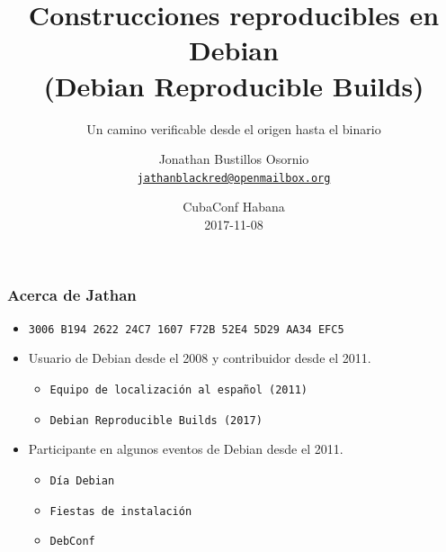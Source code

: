 \documentclass[14pt,aspectratio=169]{beamer}
\title[Reproducible Builds]{Construcciones reproducibles en Debian\\
(Debian Reproducible Builds)}
\subtitle{Un camino verificable desde el origen hasta el binario}
\author[Jathan]{%
   \texorpdfstring{
            Jonathan Bustillos Osornio\\
            \href{mailto:jathanblackred@openmailbox.org}{\texttt{jathanblackred@openmailbox.org}}
   }{Jathan}}
\institute[Debian]{}
\date[CubaConf Habana 2017]{%
 CubaConf Habana\\
 \small
 2017-11-08}
\begin{document}
\begin{frame}
\titlepage
\end{frame}

\begin{frame}
 \frametitle{Acerca de Jathan}

 \begin{itemize}
  \item \small{\texttt{3006 B194 2622 24C7 1607 F72B 52E4 5D29 AA34 EFC5}}
  \item Usuario de Debian desde el 2008 y contribuidor desde el 2011.
    \begin{itemize}
    \item \texttt{Equipo de localización al español (2011)}
    \item \texttt{Debian Reproducible Builds (2017)}
   \end{itemize}   
  \item Participante en algunos eventos de Debian desde el 2011.
   \begin{itemize}
    \item \texttt{Día Debian}
    \item \texttt{Fiestas de instalación}
    \item \texttt{DebConf}
   \end{itemize}
 \end{itemize}
\end{frame}
\end{document}
